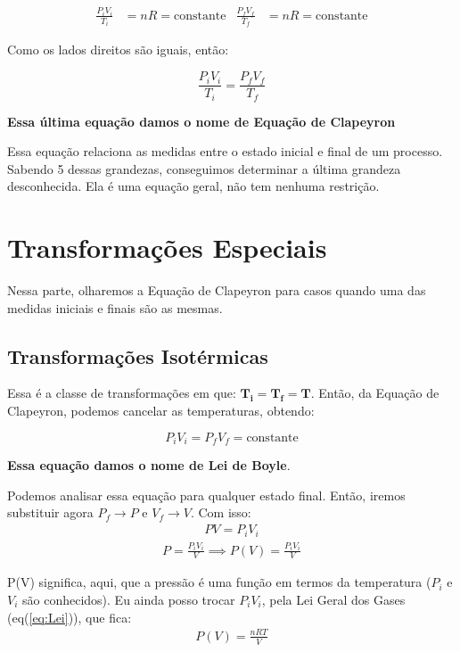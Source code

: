 \documentclass[12pt]{extarticle}
\newcommand{\<}{\langle}
\renewcommand{\>}{\rangle}
\theoremstyle{definition}
\begin{document}
\begin{align}
    \frac{P_i V_i}{T_i} &= nR = \text{constante} & \frac{P_f V_f}{T_f} &= nR = \text{constante}
\end{align}

Como os lados direitos são iguais, então:

\begin{equation}
    \frac{P_i V_i}{T_i} = \frac{P_f V_f}{T_f}
\end{equation}

\textbf{Essa última equação damos o nome de Equação de Clapeyron}

Essa equação relaciona as medidas entre o estado inicial e final de um processo. Sabendo 5 dessas grandezas, conseguimos determinar a última grandeza desconhecida. Ela é uma equação geral, não tem nenhuma restrição.

\section{Transformações Especiais}

Nessa parte, olharemos a Equação de Clapeyron para casos quando uma das medidas iniciais e finais são as mesmas.

\subsection{Transformações Isotérmicas}

Essa é a classe de transformações em que: $\mathbf{T_i = T_f=T}$. Então, da Equação de Clapeyron, podemos cancelar as temperaturas, obtendo:

\begin{equation}
    P_i V_i = P_f V_f = \text{constante}
\end{equation}

\textbf{Essa equação damos o nome de Lei de Boyle}.

Podemos analisar essa equação para qualquer estado final. Então, iremos substituir agora $P_f \rightarrow P$ e $V_f \rightarrow V$. Com isso:
\begin{align*}
    PV = P_i V_i
\end{align*}
\begin{align}
    P = \frac{P_i V_i}{V} \implies P(V) = \frac{P_i V_i}{V}
\end{align}

P(V) significa, aqui, que a pressão é uma função em termos da temperatura ($P_i$ e $V_i$ são conhecidos). Eu ainda posso trocar $P_i V_i$, pela Lei Geral dos Gases (eq(\ref{eq:Lei})), que fica: 
\begin{align*}
    P(V) = \frac{n R T}{V}
\end{align*}
\end{document}
